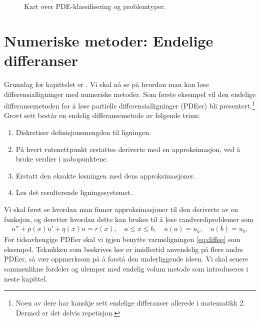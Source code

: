 \begin{landscape}
\begin{figure}[p]
\caption{Kart over PDE-klassifisering og problemtyper.}\label{fig:kart_pdetyper}
\end{figure}
\end{landscape}

\section{Numeriske metoder: Endelige differanser}\label{sect:endifferanser}

Grunnlag for kapittelet er \cite{KaM20}.
Vi skal nå se på hvordan man kan løse differensialligninger med numeriske metoder. Som første eksempel vil den endelige differansemetoden for å løse partielle differensialligninger (PDEer) bli presentert.\footnote{Noen av dere har kanskje sett endelige differanser allerede i matematikk 2. Dermed er det delvis repetisjon.}
Grovt sett består en endelig differansemetode av følgende trinn:
\begin{enumerate}
    \item Diskretiser definisjonsmengden til ligningen.
    \item På hvert rutenettpunkt erstattes deriverte med en approksimasjon, ved å bruke verdier i nabopunktene.
    \item Erstatt den eksakte løsningen med dens approksimasjoner.
    \item Løs det resulterende ligningssystemet.
\end{enumerate}
Vi skal først se hvordan man finner approksimasjoner til den deriverte av en funksjon, og deretter hvordan dette kan brukes til å løse randverdiproblemer som
\begin{align}\label{2P-RVP}
u'' + p(x)u' + q(x)u = r(x), \quad a \leq x \leq b, \quad u(a) = u_a, \quad u(b) = u_b,
\end{align}
For tidsavhengige PDEer skal vi igjen benytte varmeligningen \eqref{eq:diffeq} som eksempel. Teknikken som beskrives her er imidlertid anvendelig på flere andre PDEer, så vær oppmerksom på å forstå den underliggende ideen. Vi skal senere sammenlikne fordeler og ulemper med endelig volum metode som introduseres i neste kapittel.


